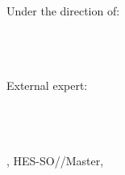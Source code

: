 \begin{titlepage}
{\begin{flushright}
		{
		\large Under the direction of: \\ 
		\Supervisor \\
		\SupervisorSchool \\
		\SupervisorResearchUnit \\[0.5cm]
		}
		
		{
		\large External expert: \\
		\Expert \\
		\ExpertSchool \\
		\ExpertResearchUnit \\
		}
		
		\vfill
		
		{\large \Locality, HES-SO//Master, \Date}
		
	\end{flushright}		
}
\end{titlepage}